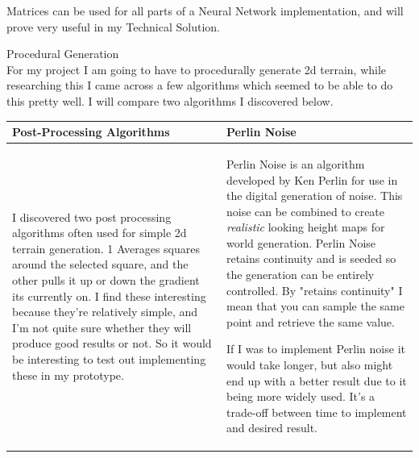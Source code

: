 \begin{flushleft}
\begin{enumerate}
\begin{enumerate}
                    Matrices can be used for all parts of a Neural Network implementation, and will prove very useful in my Technical
                    Solution. \\
                    \vspace{0.5cm}
                    
                    \pagebreak
                    {\Large Procedural Generation} \\
                    For my project I am going to have to procedurally generate 2d terrain, while researching this I came across a few algorithms
                    which seemed to be able to do this pretty well. I will compare two algorithms I discovered below.
                    
                    \begin{flushleft}
                        \begin{tabular}{| C{6cm} | C{6cm} |}
                            \hline
                            {\Large Post-Processing Algorithms} & {\Large Perlin Noise} \\
                            \hline
                            I discovered two post processing algorithms often used for simple 2d terrain generation. 1 Averages squares 
                            around the selected square, and the other pulls it up or down the gradient its currently on.
                            I find these interesting because they're relatively simple, and I'm not quite sure whether they will produce good results or not. 
                            \vspace{0.2cm}\linebreak
                            So it would be interesting to test out implementing these in my prototype.
                            &
                            Perlin Noise is an algorithm developed by Ken Perlin for use in the digital generation of noise.
                            This noise can be combined to create \textit{realistic} looking height maps for world generation.
                            Perlin Noise retains continuity and is seeded so the generation can be entirely controlled.
                            By "retains continuity" I mean that you can sample the same point and retrieve the same value. 
                            \vspace{0.2cm}\linebreak
                            
                            If I was to implement Perlin noise it would take longer, but also might end up with a better result
                            due to it being more widely used. It's a trade-off between time to implement and desired result. \\
                            \hline
                        \end{tabular}
                    \end{flushleft}
                    

\end{enumerate}
\end{enumerate}
\end{flushleft}
